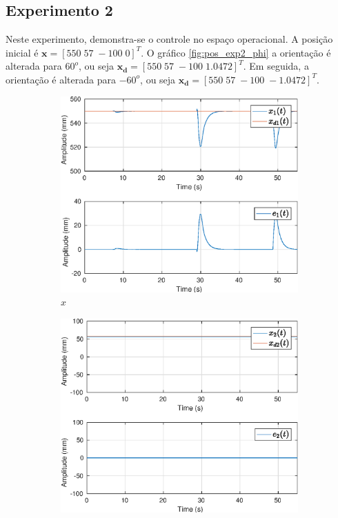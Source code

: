 \subsection{Experimento 2}

Neste experimento, demonstra-se o controle no espaço operacional.
A posição inicial é $\bm{x} =[ 550 \; 57 \; -100 \; 0]^T$. O gráfico \ref{fig:pos_exp2_phi} a orientação é alterada para $60^o$, ou seja $\bm{x_d} =[ 550 \; 57 \; -100 \; 1.0472]^T$. Em seguida, a orientação é alterada para $-60^o$, ou seja $\bm{x_d} =[ 550 \; 57 \; -100 \; -1.0472]^T$. 

\begin{figure}[H]
\centering
\begin{subfigure}{.5\textwidth}
  \centering
  \includegraphics[width=\linewidth]{./img/position2/x1.eps}
  \caption{$x$}
  \label{fig:sub1}
\end{subfigure}%
\begin{subfigure}{.5\textwidth}
  \centering
  \includegraphics[width=\linewidth]{./img/position2/x2.eps}

\end{subfigure}
\end{figure}

